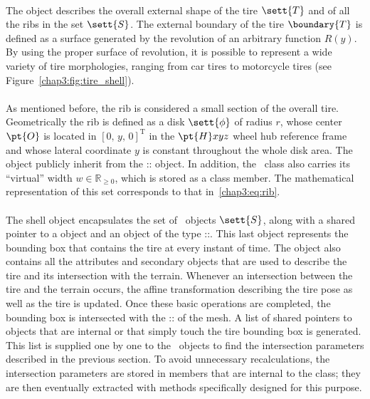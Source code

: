 \paragraph*{\Shape{}}
The \Shape{} object describes the overall external shape of the tire $\sett{T}$ and of all the ribs in the set $\sett{S}$. The external boundary of the tire $\boundary{T}$ is defined as a surface generated by the revolution of an arbitrary function $R(y)$. By using the proper surface of revolution, it is possible to represent a wide variety of tire morphologies, ranging from car tires to motorcycle tires (see Figure~\ref{chap3:fig:tire_shell}).

\paragraph*{\Rib{}}
As mentioned before, the rib is considered a small section of the overall tire. Geometrically the rib is defined as a disk $\sett{\phi}$ of radius $r$, whose center $\pt{O}$ is located in $[0, \, y, \, 0]^\mathrm{T}$ in the $\pt{H}xyz$ wheel hub reference frame and whose lateral coordinate $y$ is constant throughout the whole disk area. The~\Rib{} object publicly inherit from the \Acme{}::\Disk{} object. In addition, the~\Rib{} class also carries its ``virtual'' width $w \in \mathbb{R}_{\geq 0}$, which is stored as a class member. The mathematical representation of this set corresponds to that in~\eqref{chap3:eq:rib}.

\paragraph*{\Shell{}}
The shell object encapsulates the set of~\Rib{} objects $\sett{S}$, along with a shared pointer to a \Shape{} object and an object of the type \Acme{}::\Aabb{}. This last object represents the bounding box that contains the tire at every instant of time. The \Shell{} object also contains all the attributes and secondary objects that are used to describe the tire and its intersection with the terrain. Whenever an intersection between the tire and the terrain occurs, the affine transformation describing the tire pose as well as the tire \Aabb{} is updated. Once these basic operations are completed, the bounding box is intersected with the \Acme{}::\AabbTree{} of the mesh. A list of shared pointers to \TriangleGround{} objects that are internal or that simply touch the tire bounding box is generated. This list is supplied one by one to the~\Rib{} objects to find the intersection parameters described in the previous section. To avoid unnecessary recalculations, the intersection parameters are stored in members that are internal to the \Shell{} class; they are then eventually extracted with methods specifically designed for this purpose.

